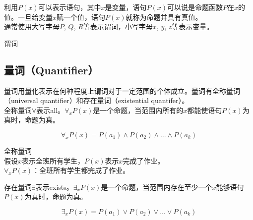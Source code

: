 \documentclass[12pt, openany, oneside]{book}
\begin{document}
利用$ P(x) $可以表示语句，其中$ x $是变量，语句$ P(x) $可以说是命题函数$ P $在$ x $的值。一旦给变量$ x $赋一个值，语句$ P(x) $就称为命题并具有真值。 \\

通常使用大写字母$ P $, $ Q $, $ R $等表示谓词，小写字母$ x $, $ y $, $ z $等表示变量。

\begin{tcolorbox}
    谓词
    \begin{table}[H]
        \centering
    \end{table}
\end{tcolorbox}

\subsection{量词（Quantifier）}

量词用量化表示在何种程度上谓词对于一定范围的个体成立。量词有全称量词（universal quantifier）和存在量词（existential quantifer）。 \\

全称量词$ \forall $表示all。$ \forall_x P(x) $是一个命题，当范围内所有的$ x $都能使语句$ P(x) $为真时，命题为真。

$$
    \forall_x P(x) = P(a_1) \wedge P(a_2) \wedge \dots \wedge P(a_k)
$$

\begin{tcolorbox}
    全称量词 \\
    假设$ x $表示全班所有学生，$ P(x) $表示$ x $完成了作业。 \\
    $ \forall_x P(x) $：全班所有学生都完成了作业。
\end{tcolorbox}

存在量词$ \exists $表示exists。$ \exists_x P(x) $是一个命题，当范围内存在至少一个$ x $能够语句$ P(x) $为真时，命题为真。

$$
    \exists_x P(x) = P(a_1) \vee P(a_2) \vee \dots \vee P(a_k)
$$
\end{document}
